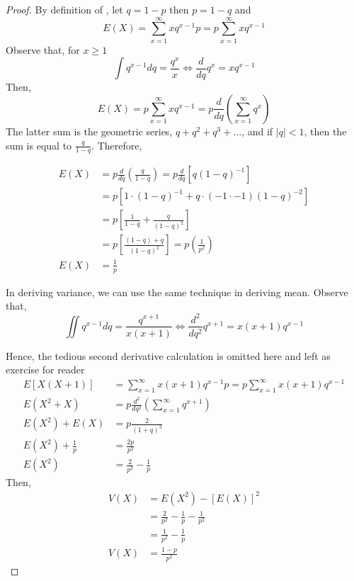 \begin{proof}
    By definition of , let $q = 1-p$ then $p = 1 - q$ and
    \[
        E(X) = \sum^{\infty}_{x = 1} xq^{x-1}p = p\sum^{\infty}_{x = 1} xq^{x-1}
    \]
    Observe that, for $x \geq 1$
    \[
       \int{q^{x-1}} dq = \frac{q^x}{x}  \iff \frac{d}{dq} q^x = xq^{x-1}
    \]
    Then,
    \[
        E(X) = p\sum^{\infty}_{x = 1} xq^{x-1} = p\frac{d}{dq}\left(\sum^{\infty}_{x = 1} q^x\right)
    \]
    The latter sum is the geometric series, $q + q^2 + q^3 + \ldots$, and if $|q| < 1$, then the sum is equal to $\frac{q}{1-q}$. Therefore,

    \begin{align*}
        E(X) &= p\frac{d}{dq}\left(\frac{q}{1-q}\right)  = p\frac{d}{dq}\left[q(1-q)^{-1}\right]\\
        &= p\left[1 \cdot {(1-q)}^{-1} + q \cdot (-1\cdot -1){(1-q)}^{-2}\right] \\
        &= p\left[\frac{1}{1-q} + \frac{q}{{(1-q)}^2}\right] \\
        &= p\left[\frac{(1-q) + q}{{(1-q)}^2}\right] 
        = p\left(\frac{1}{p^2}\right) \\
        E(X) &= \frac{1}{p}
    \end{align*}

    In deriving variance, we can use the same technique in deriving mean. Observe that,
    \[
        \iint{q^{x-1}} dq = \frac{q^{x+1}}{x(x+1)}   
        \iff 
        \frac{d^2}{dq^2} q^{x+1} = x(x+1)q^{x-1}
     \]
    
    Hence, the tedious second derivative calculation is omitted here and left as exercise for reader
    \begin{align*}
        E[X(X+1)] &= \sum^{\infty}_{x = 1} x(x+1)q^{x-1}p  
        = p\sum^{\infty}_{x = 1} x(x+1)q^{x-1} \\
        E(X^2 + X) &= p\frac{d^2}{dq^2} \left( \sum^{\infty}_{x = 1} q^{x+1} \right) \\
        E(X^2) + E(X) &= p\frac{2}{{(1+q)^3}} \\
        E(X^2) + \frac{1}{p} &= \frac{2p}{p^3}  \\
        E(X^2)  &= \frac{2}{p^2} - \frac{1}{p}
    \end{align*}
    Then,
    \begin{align*}
        V(X) &= E(X^2) - {[E(X)]}^2 \\
            &= \frac{2}{p^2} - \frac{1}{p} - \frac{1}{p^2} \\
            &= \frac{1}{p^2} - \frac{1}{p} \\
        V(X)    &= \frac{1-p}{p^2}
    \end{align*}

\end{proof}
